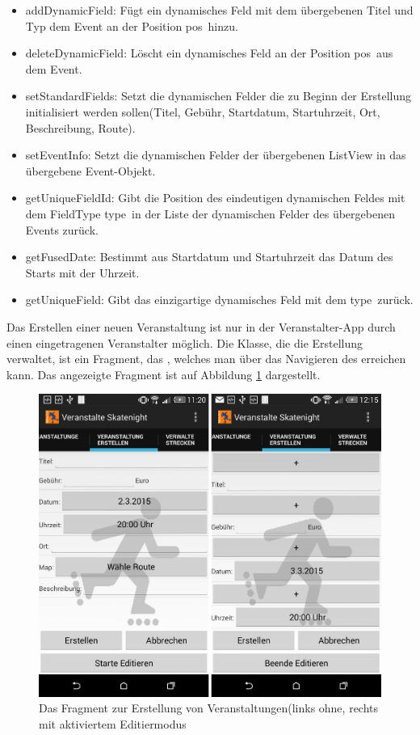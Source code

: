 \begin{itemize}
	\item addDynamicField: Fügt ein dynamisches Feld mit dem übergebenen Titel und Typ dem Event an der Position \glqq pos\grqq\ hinzu.
	\item deleteDynamicField: Löscht ein dynamisches Feld an der Position \glqq pos\grqq\ aus dem Event.
	\item setStandardFields: Setzt die dynamischen Felder die zu Beginn der Erstellung initialisiert werden sollen(Titel, Gebühr, Startdatum, Startuhrzeit, Ort, Beschreibung, Route).
	\item setEventInfo: Setzt die dynamischen Felder der übergebenen ListView in das übergebene Event-Objekt.
	\item getUniqueFieldId: Gibt die Position des eindeutigen dynamischen Feldes mit dem FieldType \glqq type\grqq\ in der Liste der dynamischen Felder des übergebenen Events zurück.
	\item getFusedDate: Bestimmt aus Startdatum und Startuhrzeit das Datum des Starts mit der Uhrzeit.
	\item getUniqueField: Gibt das einzigartige dynamisches Feld mit dem  \glqq type\grqq\ zurück.
\end{itemize}

Das Erstellen einer neuen Veranstaltung ist nur in der Veranstalter-App durch einen eingetragenen Veranstalter möglich. Die Klasse, die die Erstellung verwaltet, ist ein Fragment, das , welches man über das Navigieren des  erreichen kann. Das angezeigte Fragment ist auf Abbildung \ref{fig:VeranstaltungErstellen} dargestellt.

\begin{figure}[htb]
\centering
\includegraphics[width=12 cm]{graphics/Fragment_Veranstaltung_erstellen.png}
\caption{Das Fragment zur Erstellung von Veranstaltungen(links ohne, rechts mit aktiviertem Editiermodus}
\label{fig:VeranstaltungErstellen}
\end{figure}

